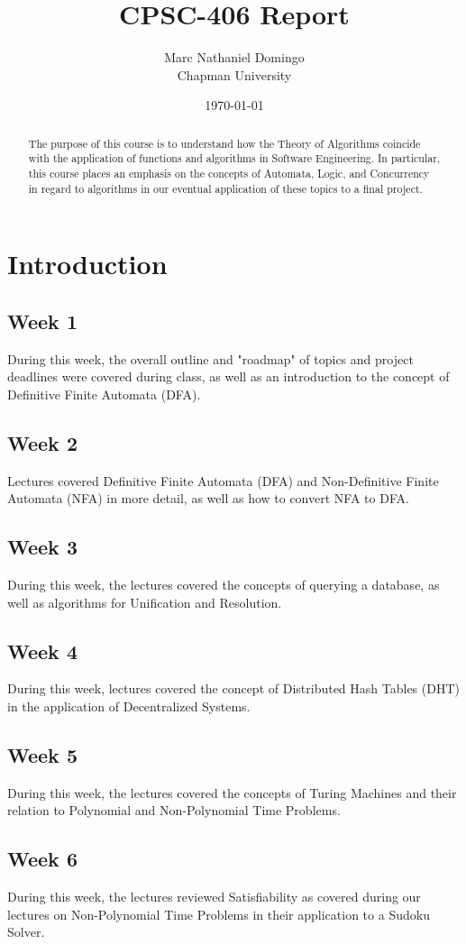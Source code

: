 \documentclass{article}
\title{CPSC-406 Report}
\author{Marc Nathaniel Domingo  \\ Chapman University}
\date{\today}
\theoremstyle{theorem}
\theoremstyle{definition}
\theoremstyle{remark}
\begin{document}
\maketitle

\begin{abstract}
The purpose of this course is to understand how the Theory of Algorithms coincide with the application of functions and algorithms in Software Engineering. In particular, this course places an emphasis on the concepts of Automata, Logic, and Concurrency in regard to algorithms in our eventual application of these topics to a final project. 
\end{abstract}

\tableofcontents

\section{Introduction}\label{intro}
\subsection{Week 1} During this week, the overall outline and "roadmap" of topics and project deadlines were covered during class, as well as an introduction to the concept of Definitive Finite Automata (DFA).
\subsection{Week 2} Lectures covered Definitive Finite Automata (DFA) and Non-Definitive Finite Automata (NFA) in more detail, as well as how to convert NFA to DFA.
\subsection{Week 3} During this week, the lectures covered the concepts of querying a database, as well as algorithms for Unification and Resolution.
\subsection{Week 4} During this week, lectures covered the concept of Distributed Hash Tables (DHT) in the application of Decentralized Systems.
\subsection{Week 5} During this week, the lectures covered the concepts of Turing Machines and their relation to Polynomial and Non-Polynomial Time Problems.
\subsection{Week 6} During this week, the lectures reviewed Satisfiability as covered during our lectures on Non-Polynomial Time Problems in their application to a Sudoku Solver.
\end{document}
